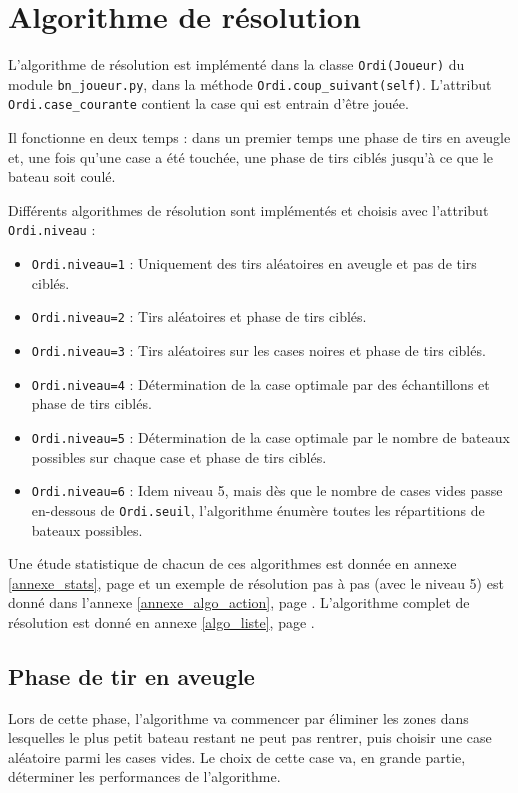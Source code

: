 \chapter{Algorithme de résolution}

L'algorithme de résolution est implémenté dans la classe \texttt{Ordi(Joueur)} du module \texttt{bn\_joueur.py}, dans la méthode \texttt{Ordi.coup\_suivant(self)}. L'attribut \texttt{Ordi.case\_courante} contient la case qui est entrain d'être jouée.

Il fonctionne en deux temps : dans un premier temps une phase de tirs en aveugle et, une fois qu'une case a été touchée, une phase de tirs ciblés jusqu'à ce que le bateau soit coulé.

Différents algorithmes de résolution sont implémentés et choisis avec l'attribut \texttt{Ordi.niveau} :
\begin{itemize}
\item \texttt{Ordi.niveau=1} : Uniquement des tirs aléatoires en aveugle et pas de tirs ciblés.
\item \texttt{Ordi.niveau=2} : Tirs aléatoires et phase de tirs ciblés.
\item \texttt{Ordi.niveau=3} : Tirs aléatoires sur les cases noires  et phase de tirs ciblés.
\item \texttt{Ordi.niveau=4} : Détermination de la case optimale par des échantillons et phase de tirs ciblés.
\item \texttt{Ordi.niveau=5} : Détermination de la case optimale par le nombre de bateaux possibles sur chaque case et phase de tirs ciblés.
\item \texttt{Ordi.niveau=6} : Idem niveau 5, mais dès que le nombre de cases vides passe en-dessous de \texttt{Ordi.seuil}, l'algorithme énumère toutes les répartitions de bateaux possibles.
\end{itemize}

Une étude statistique de chacun de ces algorithmes est donnée en annexe \ref{annexe_stats}, page \pageref{annexe_stats} et un exemple de résolution pas à pas (avec le niveau 5) est donné dans l'annexe \ref{annexe_algo_action}, page \pageref{annexe_algo_action}. L'algorithme complet de résolution est donné en annexe \ref{algo_liste}, page \pageref{algo_resolution}.




\section{Phase de tir en aveugle}
Lors de cette phase, l'algorithme va commencer par éliminer les zones dans lesquelles le plus petit bateau restant ne peut pas rentrer, puis choisir une case aléatoire parmi les cases vides. Le choix de cette case va, en grande partie, déterminer les performances de l'algorithme.

